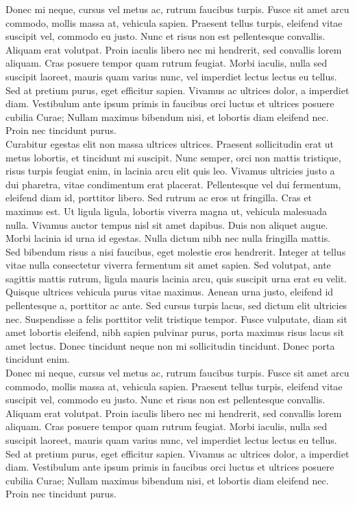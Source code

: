 Donec mi neque, cursus vel metus ac, rutrum faucibus turpis. Fusce sit amet arcu commodo, mollis massa at, vehicula sapien. Praesent tellus turpis, eleifend vitae suscipit vel, commodo eu justo. Nunc et risus non est pellentesque convallis. Aliquam erat volutpat. Proin iaculis libero nec mi hendrerit, sed convallis lorem aliquam. Cras posuere tempor quam rutrum feugiat. Morbi iaculis, nulla sed suscipit laoreet, mauris quam varius nunc, vel imperdiet lectus lectus eu tellus. Sed at pretium purus, eget efficitur sapien. Vivamus ac ultrices dolor, a imperdiet diam. Vestibulum ante ipsum primis in faucibus orci luctus et ultrices posuere cubilia Curae; Nullam maximus bibendum nisi, et lobortis diam eleifend nec. Proin nec tincidunt purus. 
\\

Curabitur egestas elit non massa ultrices ultrices. Praesent sollicitudin erat ut metus lobortis, et tincidunt mi suscipit. Nunc semper, orci non mattis tristique, risus turpis feugiat enim, in lacinia arcu elit quis leo. Vivamus ultricies justo a dui pharetra, vitae condimentum erat placerat. Pellentesque vel dui fermentum, eleifend diam id, porttitor libero. Sed rutrum ac eros ut fringilla. Cras et maximus est. Ut ligula ligula, lobortis viverra magna ut, vehicula malesuada nulla. Vivamus auctor tempus nisl sit amet dapibus. Duis non aliquet augue. Morbi lacinia id urna id egestas. Nulla dictum nibh nec nulla fringilla mattis.
\\

Sed bibendum risus a nisi faucibus, eget molestie eros hendrerit. Integer at tellus vitae nulla consectetur viverra fermentum sit amet sapien. Sed volutpat, ante sagittis mattis rutrum, ligula mauris lacinia arcu, quis suscipit urna erat eu velit. Quisque ultrices vehicula purus vitae maximus. Aenean urna justo, eleifend id pellentesque a, porttitor ac ante. Sed cursus turpis lacus, sed dictum elit ultricies nec. Suspendisse a felis porttitor velit tristique tempor. Fusce vulputate, diam sit amet lobortis eleifend, nibh sapien pulvinar purus, porta maximus risus lacus sit amet lectus. Donec tincidunt neque non mi sollicitudin tincidunt. Donec porta tincidunt enim.
\\

Donec mi neque, cursus vel metus ac, rutrum faucibus turpis. Fusce sit amet arcu commodo, mollis massa at, vehicula sapien. Praesent tellus turpis, eleifend vitae suscipit vel, commodo eu justo. Nunc et risus non est pellentesque convallis. Aliquam erat volutpat. Proin iaculis libero nec mi hendrerit, sed convallis lorem aliquam. Cras posuere tempor quam rutrum feugiat. Morbi iaculis, nulla sed suscipit laoreet, mauris quam varius nunc, vel imperdiet lectus lectus eu tellus. Sed at pretium purus, eget efficitur sapien. Vivamus ac ultrices dolor, a imperdiet diam. Vestibulum ante ipsum primis in faucibus orci luctus et ultrices posuere cubilia Curae; Nullam maximus bibendum nisi, et lobortis diam eleifend nec. Proin nec tincidunt purus. 